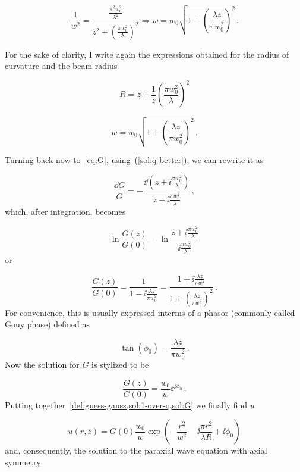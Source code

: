 \documentclass[12pt, class=report, crop=false]{standalone}
\begin{document}
\begin{equation*}
  \frac{1}{w^2} = \frac{\frac{\pi^2 w_0^2}{\lambda^2}}{z^2 + \left(\frac{\pi w_0^2}{\lambda} \right)^2} \Rightarrow w = w_0 \sqrt{1+ \left(\frac{\lambda z}{\pi w_0^2}\right)^2}\,.
\end{equation*}

For the sake of clarity, I write again the expressions obtained for the radius of curvature and the beam radius

\begin{equation}
  R = z + \frac{1}{z} \left(\frac{\pi w_0^2}{\lambda} \right)^2
\end{equation}

\begin{equation}
  w = w_0 \sqrt{1+ \left(\frac{\lambda z}{\pi w_0^2}\right)^2}\,.
\end{equation}

Turning back now to~\cref{eq:G}, using~(\ref{sol:q-better}), we can rewrite it as

\begin{equation*}
  \frac{\dd{G}}{G} = - \frac{\dd(z+\ii \frac{\pi w_0^2}{\lambda})}{z + \ii \frac{\pi w_0^2}{\lambda}}\,,
\end{equation*}
which, after integration, becomes

\begin{equation*}
  \ln{\frac{G(z)}{G(0)}} = \ln{\frac{z+\ii \frac{\pi w_0^2}{\lambda}}{\ii \frac{\pi w_0^2}{\lambda}}}
\end{equation*}
or

\begin{equation}
  \frac{G(z)}{G(0)} = \frac{1}{1 - \ii \frac{\lambda z}{\pi w_0^2}} = \frac{1 + \ii \frac{\lambda z}{\pi w_0^2}}{1 +\left(\frac{\lambda z}{\pi w_0^2}\right)^2}\,.
\end{equation}
For convenience, this is usually expressed interms of a phasor (commonly called Gouy phase) defined as

\begin{equation}
  \tan(\phi_0) = \frac{\lambda z}{\pi w_0^2}\,.
\end{equation}
Now the solution for \(G\) is stylized to be

\begin{equation}
  \label{sol:G}
  \frac{G(z)}{G(0)} = \frac{w_0}{w} \ee^{\ii \phi_0}\,.
\end{equation}
Putting together~\cref{def:guess-gauss,sol:1-over-q,sol:G} we finally find \(u\)

\begin{equation}
  u(r,z) = G(0) \frac{w_0}{w} \exp(-\frac{r^2}{w^2} - \ii \frac{\pi r^2}{\lambda R} + \ii \phi_0)
\end{equation}
and, consequently, the solution to the paraxial wave equation with axial symmetry
\end{document}
